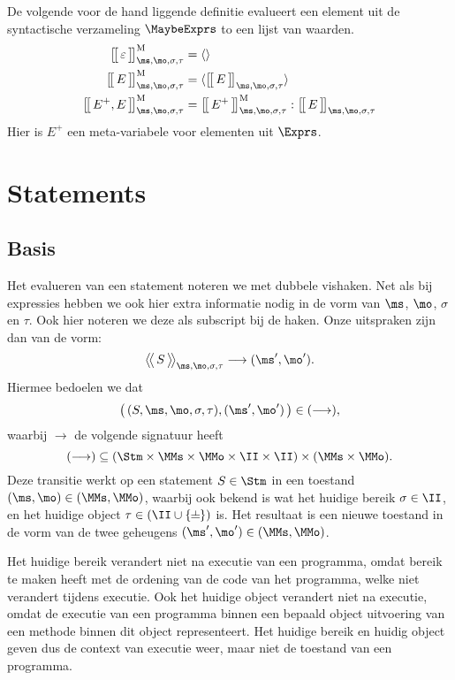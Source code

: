 De volgende voor de hand liggende definitie evalueert een element uit de syntactische verzameling $\MaybeExprs$ to een lijst van waarden.
%
\begin{align*}
  \Express[M]{\varepsilon}{\ms,\mo,\sigma,\tau} &= \langle\rangle \\
  \Express[M]{E}{\ms,\mo,\sigma,\tau} &= \langle \Express{E}{\ms,\mo,\sigma,\tau} \rangle \\
  \Express[M]{E^+, E}{\ms,\mo,\sigma,\tau} &= \Express[M]{E^+}{\ms,\mo,\sigma,\tau} : \Express{E}{\ms,\mo,\sigma,\tau}
\end{align*}
%
Hier is $E^+$ een meta-variabele voor elementen uit $\Exprs$.

\section{Statements}

\subsection{Basis}

Het evalueren van een statement noteren we met dubbele vishaken. Net als bij expressies hebben we ook hier extra informatie nodig in de vorm van $\ms$, $\mo$, $\sigma$ en $\tau$. Ook hier noteren we deze als subscript bij de haken. Onze uitspraken zijn dan van de vorm:
%
\begin{equation*}
  \Config{S}{\ms,\mo,\sigma,\tau} \longrightarrow (\ms',\mo').
\end{equation*}
%
Hiermee bedoelen we dat
%
\begin{equation*}
  \big(\,(S,\ms,\mo,\sigma,\tau), (\ms',\mo')\,\big) \in (\longrightarrow),
\end{equation*}
%
waarbij $\longrightarrow$ de volgende signatuur heeft 
%
\begin{equation*}
  (\longrightarrow) \subseteq (\Stm \times \MMs \times \MMo \times \II \times \II) \times (\MMs \times \MMo).
\end{equation*}
%
Deze transitie werkt op een statement $S\in\Stm$ in een toestand $(\ms,\mo)\in(\MMs,\MMo)$, waarbij ook bekend is wat het huidige bereik $\sigma \in \II$, en het huidige object $\tau \in (\II \cup \{\nil\})$ is. Het resultaat is een nieuwe toestand in de vorm van de twee geheugens $(\ms',\mo') \in (\MMs,\MMo)$.

Het huidige bereik verandert niet na executie van een programma, omdat bereik te maken heeft met de ordening van de code van het programma, welke niet verandert tijdens executie. Ook het huidige object verandert niet na executie, omdat de executie van een programma binnen een bepaald object uitvoering van een methode binnen dit object representeert. Het huidige bereik en huidig object geven dus de context van executie weer, maar niet de toestand van een programma.

